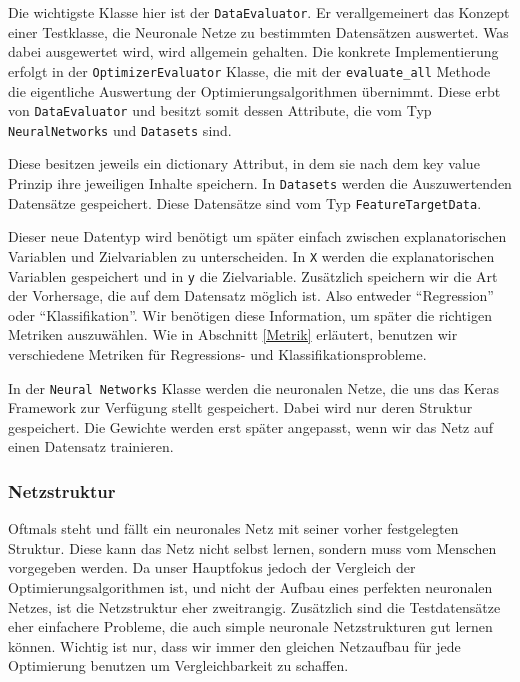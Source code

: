 Die wichtigste Klasse hier ist der \texttt{DataEvaluator}. Er verallgemeinert 
das Konzept einer Testklasse, die Neuronale Netze zu bestimmten Datensätzen auswertet.
Was dabei ausgewertet wird, wird allgemein gehalten. Die konkrete Implementierung erfolgt 
in der \texttt{OptimizerEvaluator} Klasse, die mit der \texttt{evaluate\_all} Methode
die eigentliche Auswertung der Optimierungsalgorithmen übernimmt. Diese 
erbt von \texttt{DataEvaluator} und besitzt somit dessen Attribute, die vom Typ
\texttt{NeuralNetworks} und \texttt{Datasets} sind.

Diese besitzen jeweils ein dictionary
Attribut, in dem sie nach dem key value Prinzip ihre jeweiligen Inhalte speichern.
In \texttt{Datasets} werden die Auszuwertenden Datensätze gespeichert. Diese Datensätze
sind vom Typ \texttt{FeatureTargetData}. 

Dieser neue Datentyp wird benötigt
um später einfach zwischen explanatorischen Variablen und Zielvariablen zu unterscheiden.
In \texttt{X} werden die explanatorischen Variablen gespeichert und in \texttt{y} die Zielvariable.
Zusätzlich speichern wir die Art der Vorhersage, die auf dem Datensatz möglich ist.
Also entweder ``Regression'' oder ``Klassifikation''. Wir benötigen diese Information, 
um später die richtigen Metriken auszuwählen. Wie in Abschnitt \ref{Metrik} erläutert, 
benutzen wir verschiedene Metriken für Regressions- und Klassifikationsprobleme.

In der \texttt{Neural Networks} Klasse werden die neuronalen Netze, die 
uns das Keras Framework zur Verfügung stellt gespeichert. Dabei wird nur deren
Struktur gespeichert. Die Gewichte werden erst später angepasst, wenn wir das Netz
auf einen Datensatz trainieren. 

\subsubsection{Netzstruktur}

Oftmals steht und fällt ein neuronales Netz mit seiner vorher festgelegten
Struktur. Diese kann das Netz nicht selbst lernen, sondern muss vom Menschen 
vorgegeben werden. Da unser Hauptfokus jedoch der Vergleich der Optimierungsalgorithmen
ist, und nicht der Aufbau eines perfekten neuronalen Netzes,
ist die Netzstruktur eher zweitrangig. Zusätzlich sind die 
Testdatensätze eher einfachere Probleme, die auch simple 
neuronale Netzstrukturen gut lernen können. Wichtig ist nur, dass wir immer 
den gleichen Netzaufbau für jede Optimierung benutzen um Vergleichbarkeit zu schaffen. 

